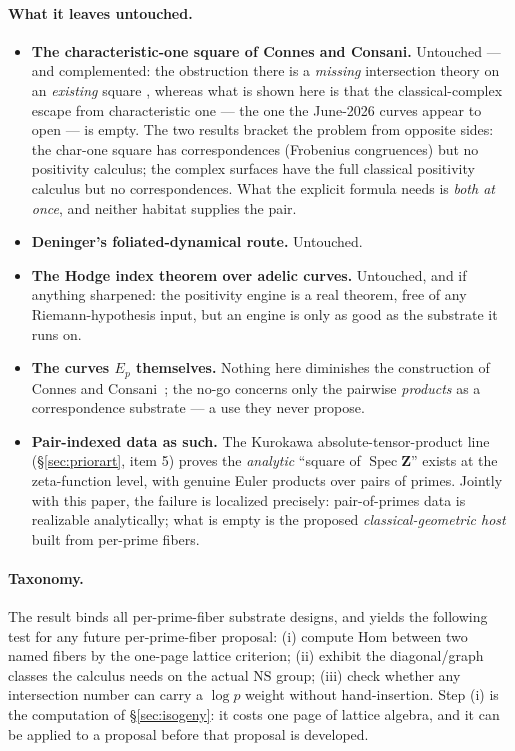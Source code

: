 \documentclass[11pt]{article}
\theoremstyle{definition}
\theoremstyle{remark}
\newcommand{\Z}{\mathbf{Z}}
\newcommand{\NS}{\mathrm{NS}}
\newcommand{\Hom}{\mathrm{Hom}}
\newcommand{\SpecZ}{\operatorname{Spec}\Z}
\begin{document}
\paragraph{What it leaves untouched.}
\begin{itemize}
\item \textbf{The characteristic-one square of Connes and Consani.}
Untouched --- and complemented: the obstruction there is a \emph{missing}
intersection theory on an \emph{existing} square \cite{CC16}\cite[\S4.3.2]{CE15},
whereas what is shown here is that the classical-complex escape from
characteristic one --- the one the June-2026 curves appear to open --- is
empty. The two results bracket the problem from opposite sides: the char-one
square has correspondences (Frobenius congruences) but no positivity
calculus; the complex surfaces have the full classical positivity calculus
but no correspondences. What the explicit formula needs is \emph{both at
once}, and neither habitat supplies the pair.
\item \textbf{Deninger's foliated-dynamical route.} Untouched.
\item \textbf{The Hodge index theorem over adelic curves.} Untouched, and if
anything sharpened: the positivity engine is a real theorem, free of any
Riemann-hypothesis input, but an engine is only as good as the substrate it
runs on.
\item \textbf{The curves $E_p$ themselves.} Nothing here diminishes the
construction of Connes and Consani~\cite{CC26}; the no-go concerns only the
pairwise \emph{products} as a correspondence substrate --- a use they never
propose.
\item \textbf{Pair-indexed data as such.} The Kurokawa
absolute-tensor-product line (\S\ref{sec:priorart}, item 5) proves the
\emph{analytic} ``square of $\SpecZ$'' exists at the zeta-function level,
with genuine Euler products over pairs of primes. Jointly with this paper,
the failure is localized precisely: pair-of-primes data is realizable
analytically; what is empty is the proposed \emph{classical-geometric host}
built from per-prime fibers.
\end{itemize}

\paragraph{Taxonomy.}
The result binds all per-prime-fiber substrate designs, and yields the
following test for any future per-prime-fiber proposal: (i)
compute $\Hom$ between two named fibers by the one-page lattice criterion;
(ii) exhibit the diagonal/graph classes the calculus needs on the actual
$\NS$ group; (iii) check whether any intersection number can carry a
$\log p$ weight without hand-insertion. Step (i) is the computation of
\S\ref{sec:isogeny}: it costs one page of lattice algebra, and it can be
applied to a proposal before that proposal is developed.
\end{document}

